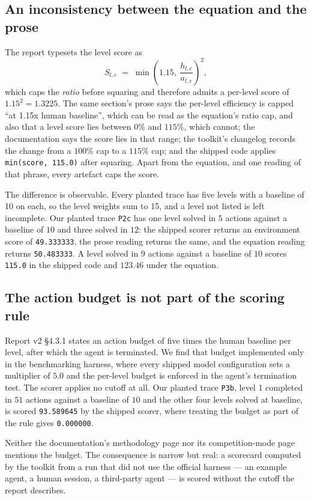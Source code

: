 \documentclass[11pt]{article}
\newcommand{\code}[1]{\texttt{#1}}
\begin{document}
\subsection{An inconsistency between the equation and the prose}

The report typesets the level score as
\[
S_{l,e} \;=\; \min\!\left(1.15,\ \frac{h_{l,e}}{a_{l,e}}\right)^{\!2},
\]
which caps the \emph{ratio} before squaring and therefore admits a per-level
score of $1.15^2 = 1.3225$. The same section's prose says the per-level
efficiency is capped ``at 1.15x human baseline'', which can be read as the
equation's ratio cap, and also that a level score lies between $0\%$ and
$115\%$, which cannot; the documentation says the score lies in that range; the
toolkit's changelog records the change from a $100\%$ cap to a $115\%$ cap; and
the shipped code applies \code{min(score, 115.0)} after squaring. Apart from the
equation, and one reading of that phrase, every artefact caps the score.

The difference is observable. Every planted trace has five levels with a
baseline of 10 on each, so the level weights sum to 15, and a level not listed
is left incomplete. Our planted trace \code{P2c} has one level solved
in $5$ actions against a baseline of $10$ and three solved in $12$: the shipped
scorer returns an environment score of \code{49.333333}, the prose reading
returns the same, and the equation reading returns \code{50.483333}. A level
solved in $9$ actions against a baseline of $10$ scores \code{115.0} in the
shipped code and $123.46$ under the equation.

\subsection{The action budget is not part of the scoring rule}

Report v2 \S4.3.1 states an action budget of five times the human baseline per
level, after which the agent is terminated. We find that budget implemented only
in the benchmarking harness, where every shipped model configuration sets a
multiplier of $5.0$ and the per-level budget is enforced in the agent's
termination test. The scorer applies no cutoff at all. Our planted trace
\code{P3b}, level 1 completed in $51$ actions against a baseline of $10$ and
the other four levels solved at baseline, is scored \code{93.589645} by the shipped scorer, where treating the budget as part
of the rule gives \code{0.000000}.

Neither the documentation's methodology page nor its competition-mode page
mentions the budget. The consequence is narrow but real: a scorecard computed by
the toolkit from a run that did not use the official harness --- an example
agent, a human session, a third-party agent --- is scored without the cutoff the
report describes.
\end{document}

